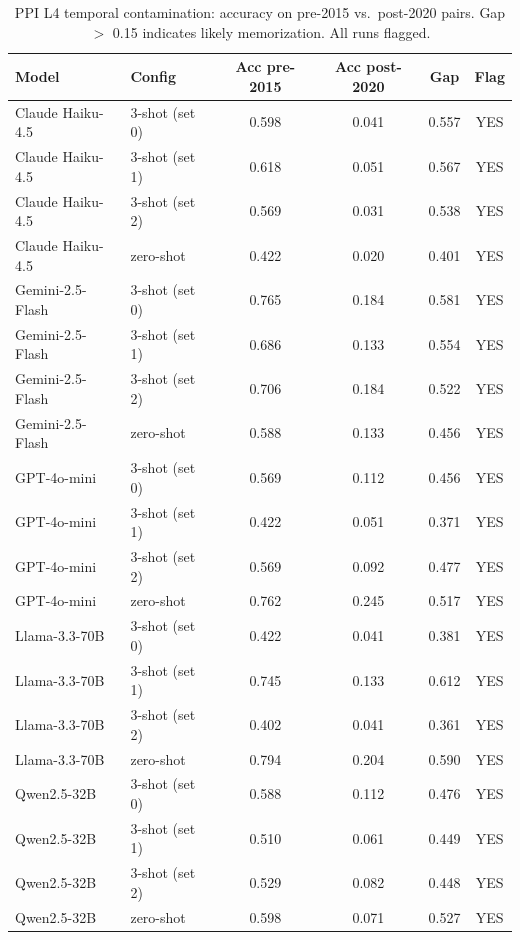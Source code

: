 \begin{table}[h]
\centering
\caption{PPI L4 temporal contamination: accuracy on pre-2015 vs.\ post-2020 pairs. Gap $>$ 0.15 indicates likely memorization. All runs flagged.}
\label{tab:ppi_contam_full}
\scriptsize
\begin{tabular}{@{}llcccc@{}}
\toprule
\textbf{Model} & \textbf{Config} & \textbf{Acc pre-2015} & \textbf{Acc post-2020} & \textbf{Gap} & \textbf{Flag} \\
\midrule
Claude Haiku-4.5 & 3-shot (set 0) & 0.598 & 0.041 & 0.557 & YES \\
Claude Haiku-4.5 & 3-shot (set 1) & 0.618 & 0.051 & 0.567 & YES \\
Claude Haiku-4.5 & 3-shot (set 2) & 0.569 & 0.031 & 0.538 & YES \\
Claude Haiku-4.5 & zero-shot & 0.422 & 0.020 & 0.401 & YES \\
\midrule
Gemini-2.5-Flash & 3-shot (set 0) & 0.765 & 0.184 & 0.581 & YES \\
Gemini-2.5-Flash & 3-shot (set 1) & 0.686 & 0.133 & 0.554 & YES \\
Gemini-2.5-Flash & 3-shot (set 2) & 0.706 & 0.184 & 0.522 & YES \\
Gemini-2.5-Flash & zero-shot & 0.588 & 0.133 & 0.456 & YES \\
\midrule
GPT-4o-mini & 3-shot (set 0) & 0.569 & 0.112 & 0.456 & YES \\
GPT-4o-mini & 3-shot (set 1) & 0.422 & 0.051 & 0.371 & YES \\
GPT-4o-mini & 3-shot (set 2) & 0.569 & 0.092 & 0.477 & YES \\
GPT-4o-mini & zero-shot & 0.762 & 0.245 & 0.517 & YES \\
\midrule
Llama-3.3-70B & 3-shot (set 0) & 0.422 & 0.041 & 0.381 & YES \\
Llama-3.3-70B & 3-shot (set 1) & 0.745 & 0.133 & 0.612 & YES \\
Llama-3.3-70B & 3-shot (set 2) & 0.402 & 0.041 & 0.361 & YES \\
Llama-3.3-70B & zero-shot & 0.794 & 0.204 & 0.590 & YES \\
\midrule
Qwen2.5-32B & 3-shot (set 0) & 0.588 & 0.112 & 0.476 & YES \\
Qwen2.5-32B & 3-shot (set 1) & 0.510 & 0.061 & 0.449 & YES \\
Qwen2.5-32B & 3-shot (set 2) & 0.529 & 0.082 & 0.448 & YES \\
Qwen2.5-32B & zero-shot & 0.598 & 0.071 & 0.527 & YES \\
\bottomrule
\end{tabular}
\end{table}

